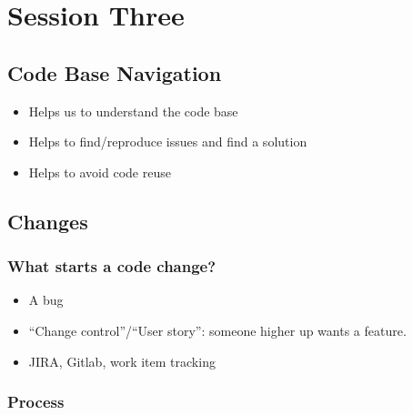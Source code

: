 \section{Session Three}\label{sec:session_three}

\subsection{Code Base Navigation}\label{sub:code_base_navigation}

\begin{itemize}
    \item Helps us to understand the code base
    \item Helps to find/reproduce issues and find a solution
    \item Helps to avoid code reuse
\end{itemize}

\subsection{Changes}\label{sub:changes}

\subsubsection{What starts a code change?}\label{ssub:what_starts_a_code_change_}

\begin{itemize}
    \item A bug
    \item ``Change control''/``User story'': someone higher up wants a feature.
    \item JIRA, Gitlab, work item tracking
\end{itemize}

\subsubsection{Process}\label{ssub:process}

